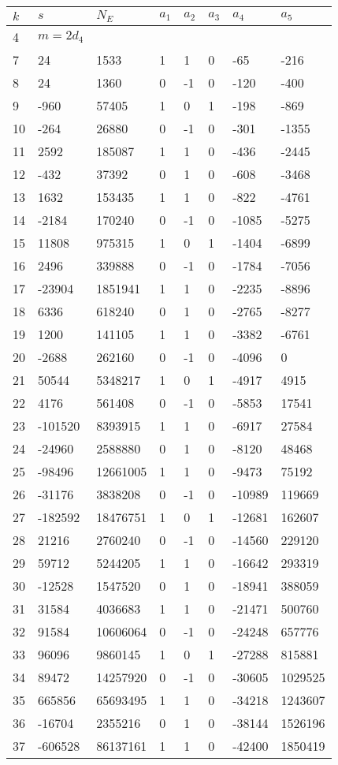 \documentclass{amsart}
\begin{document}
\begin{longtable}{|l|l|l|lllll|}
\hline
$k$ & $s$ & $N_E$ & $a_1$ & $a_2$ & $a_3$ & $a_4$ & $a_5$\\
\hline
4&$m=2d_{4}$&&\multicolumn{5}{c|}{}\\
7&24&1533&1&1&0&-65&-216\\
8&24&1360&0&-1&0&-120&-400\\
9&-960&57405&1&0&1&-198&-869\\
10&-264&26880&0&-1&0&-301&-1355\\
11&2592&185087&1&1&0&-436&-2445\\
12&-432&37392&0&1&0&-608&-3468\\
13&1632&153435&1&1&0&-822&-4761\\
14&-2184&170240&0&-1&0&-1085&-5275\\
15&11808&975315&1&0&1&-1404&-6899\\
16&2496&339888&0&-1&0&-1784&-7056\\
17&-23904&1851941&1&1&0&-2235&-8896\\
18&6336&618240&0&1&0&-2765&-8277\\
19&1200&141105&1&1&0&-3382&-6761\\
20&-2688&262160&0&-1&0&-4096&0\\
21&50544&5348217&1&0&1&-4917&4915\\
22&4176&561408&0&-1&0&-5853&17541\\
23&-101520&8393915&1&1&0&-6917&27584\\
24&-24960&2588880&0&1&0&-8120&48468\\
25&-98496&12661005&1&1&0&-9473&75192\\
26&-31176&3838208&0&-1&0&-10989&119669\\
27&-182592&18476751&1&0&1&-12681&162607\\
28&21216&2760240&0&-1&0&-14560&229120\\
29&59712&5244205&1&1&0&-16642&293319\\
30&-12528&1547520&0&1&0&-18941&388059\\
31&31584&4036683&1&1&0&-21471&500760\\
32&91584&10606064&0&-1&0&-24248&657776\\
33&96096&9860145&1&0&1&-27288&815881\\
34&89472&14257920&0&-1&0&-30605&1029525\\
35&665856&65693495&1&1&0&-34218&1243607\\
36&-16704&2355216&0&1&0&-38144&1526196\\
37&-606528&86137161&1&1&0&-42400&1850419\\

\end{longtable}
\end{document}
